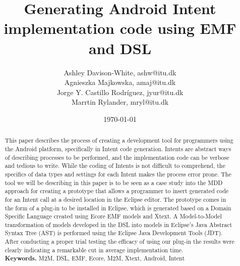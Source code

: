 \documentclass{llncs}
\title{Generating Android Intent implementation code using EMF and DSL}
\author{Ashley Davison-White, ashw@itu.dk 
      \\Agnieszka Majkowska, amaj@itu.dk
      \\Jorge Y. Castillo Rodríguez, jyur@itu.dk
      \\Marrtin Rylander, mryl@itu.dk}
\institute{IT University of Copenhagen}
\date{\today}
\begin{document}
\maketitle
\thispagestyle{plain}
\pagestyle{headings}
\setcounter{page}{1}

 \begin{abstract}
This paper describes the process of creating a development tool for programmers using the Android platform, specifically in Intent code generation. Intents are abstract ways of describing processes to be performed, and the implementation code can be verbose and tedious to write. While the coding of Intents is not difficult to comprehend, the specifics of data types and settings for each Intent makes the process error prone. The tool we will be describing in this paper is to be seen as a case study into the MDD approach for creating a prototype that allows a programmer to insert generated code for an Intent call at a desired location in the Eclipse editor. The prototype comes in the form of a plug-in to be installed in Eclipse, which is generated based on a Domain Specific Language created using Ecore EMF models and Xtext. A Model-to-Model transformation of models developed in the DSL into models in Eclipse's Java Abstract Syntax Tree (AST) is performed using the Eclipse Java Development Tools (JDT). After conducting a proper trial testing the efficacy of using our plug-in the results were clearly indicating a remarkable cut in average implementation time.   
\\[1\baselineskip]
\textbf{Keywords.} M2M, DSL, EMF, Ecore, M2M, Xtext, Android, Intent
 \end{abstract}



















\renewcommand{\bibname}{References}
\setlength{\bibsep}{0.0pt}


\end{document}

